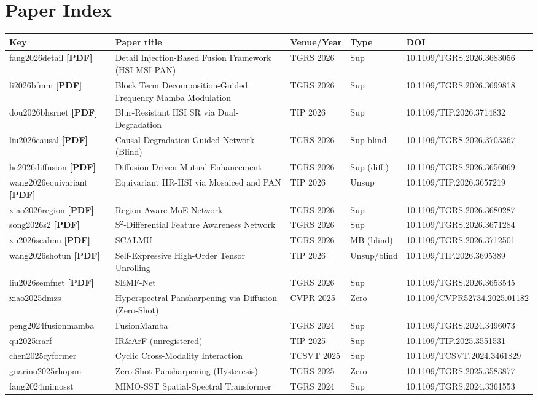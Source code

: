 \documentclass[11pt]{article}
\begin{document}
\section{Paper Index}
\small
\begin{longtable}{@{}p{2.7cm}p{4.5cm}p{1.6cm}p{1.9cm}p{3.6cm}@{}}
\toprule
\textbf{Key} & \textbf{Paper title} & \textbf{Venue/Year} & \textbf{Type} & \textbf{DOI} \\
\midrule
\endhead
\bottomrule
\endfoot
%
fang2026detail \textbf{[PDF]} & Detail Injection-Based Fusion Framework (HSI-MSI-PAN) & TGRS 2026 & Sup & 10.1109/TGRS.2026.3683056 \\
li2026bfmm \textbf{[PDF]} & Block Term Decomposition-Guided Frequency Mamba Modulation & TGRS 2026 & Sup & 10.1109/TGRS.2026.3699818 \\
dou2026bhsrnet \textbf{[PDF]} & Blur-Resistant HSI SR via Dual-Degradation & TIP 2026 & Sup & 10.1109/TIP.2026.3714832 \\
liu2026causal \textbf{[PDF]} & Causal Degradation-Guided Network (Blind) & TGRS 2026 & Sup blind & 10.1109/TGRS.2026.3703367 \\
he2026diffusion \textbf{[PDF]} & Diffusion-Driven Mutual Enhancement & TGRS 2026 & Sup (diff.) & 10.1109/TGRS.2026.3656069 \\
wang2026equivariant \textbf{[PDF]} & Equivariant HR-HSI via Mosaiced and PAN & TIP 2026 & Unsup & 10.1109/TIP.2026.3657219 \\
xiao2026region \textbf{[PDF]} & Region-Aware MoE Network & TGRS 2026 & Sup & 10.1109/TGRS.2026.3680287 \\
song2026s2 \textbf{[PDF]} & S$^2$-Differential Feature Awareness Network & TGRS 2026 & Sup & 10.1109/TGRS.2026.3671284 \\
xu2026scalmu \textbf{[PDF]} & SCALMU & TGRS 2026 & MB (blind) & 10.1109/TGRS.2026.3712501 \\
wang2026shotun \textbf{[PDF]} & Self-Expressive High-Order Tensor Unrolling & TIP 2026 & Unsup/blind & 10.1109/TIP.2026.3695389 \\
liu2026semfnet \textbf{[PDF]} & SEMF-Net & TGRS 2026 & Sup & 10.1109/TGRS.2026.3653545 \\
xiao2025dmzs & Hyperspectral Pansharpening via Diffusion (Zero-Shot) & CVPR 2025 & Zero & 10.1109/CVPR52734.2025.01182 \\
peng2024fusionmamba & FusionMamba & TGRS 2024 & Sup & 10.1109/TGRS.2024.3496073 \\
qu2025irarf & IR\&ArF (unregistered) & TIP 2025 & Sup & 10.1109/TIP.2025.3551531 \\
chen2025cyformer & Cyclic Cross-Modality Interaction & TCSVT 2025 & Sup & 10.1109/TCSVT.2024.3461829 \\
guarino2025rhopnn & Zero-Shot Pansharpening (Hysteresis) & TGRS 2025 & Zero & 10.1109/TGRS.2025.3583877 \\
fang2024mimosst & MIMO-SST Spatial-Spectral Transformer & TGRS 2024 & Sup & 10.1109/TGRS.2024.3361553 \\
\end{longtable}
\normalsize
\end{document}
